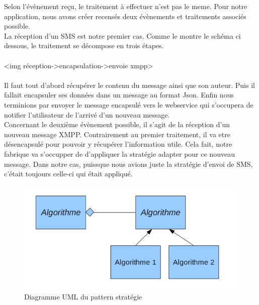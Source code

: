 Selon l'évènement reçu, le traitement à effectuer n'est pas le meme. Pour notre application, nous avons 
créer recensés deux évènements et traitements associés possible.
\\
La réception d'un SMS est notre premier cas. Comme le montre le schéma ci dessous, le traitement se 
décompose en trois étapes. 
\\\\
<img réception->encapsulation->envoie xmpp>
\\\\
Il faut tout d'abord récupérer le contenu du message ainsi que son auteur. Puis il fallait encapsuler 
ses données dans un message au format Json. Enfin nous terminions par envoyer le message encapsulé vers 
le webservice qui s'occupera de notifier l'utilisateur de l'arrivé d'un nouveau message.
\\
Concernant le deuxième évènement possible, il s'agit de la réception d'un nouveau message XMPP. Contrairement
au premier traitement, il va etre désencapsulé pour pouvoir y récupérer l'information utile. Cela fait, 
notre fabrique va s'occupper de d'appliquer la stratégie adapter pour ce nouveau message. Dans notre cas, 
puissque nous avions juste la stratégie d'envoi de SMS, c'était toujours celle-ci qui était appliqué.

\begin{figure}[!h]
	\center
	\includegraphics[width=12cm]{img/pattern-strategie.png}
	\caption{Diagramme UML du pattern stratégie}
\end{figure}


